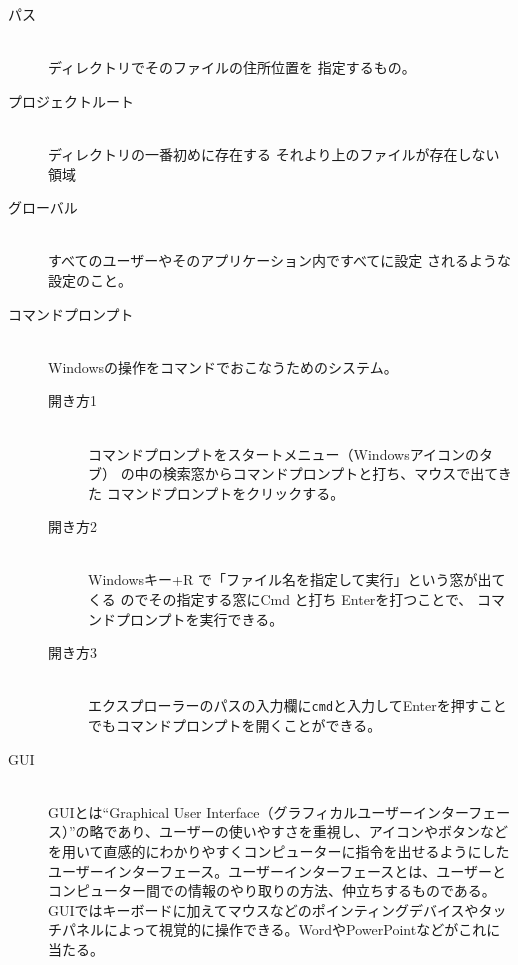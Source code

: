 \documentclass[titlepage]{ltjsarticle}
\begin{document}
\begin{description}
  \item [パス] ~\\
        ディレクトリでそのファイルの住所位置を
        指定するもの。
  \item [プロジェクトルート] ~\\
        ディレクトリの一番初めに存在する
        それより上のファイルが存在しない領域
  \item [グローバル] ~\\
        すべてのユーザーやそのアプリケーション内ですべてに設定
        されるような設定のこと。
  \item [コマンドプロンプト] ~\\
        Windowsの操作をコマンドでおこなうためのシステム。
        \begin{description}
          \item[開き方1] ~\\
            コマンドプロンプトをスタートメニュー（Windowsアイコンのタブ）
            の中の検索窓からコマンドプロンプトと打ち、マウスで出てきた
            コマンドプロンプトをクリックする。
          \item[開き方2] ~\\
            Windowsキー+R で「ファイル名を指定して実行」という窓が出てくる
            のでその指定する窓にCmd と打ち Enterを打つことで、
            コマンドプロンプトを実行できる。
            \item[開き方3]~\\
            エクスプローラーのパスの入力欄に\verb|cmd|と入力してEnterを押すことでもコマンドプロンプトを開くことができる。
        \end{description}
        \item[GUI]~\\
        GUIとは``Graphical User Interface（グラフィカルユーザーインターフェース）''の略であり、ユーザーの使いやすさを重視し、アイコンやボタンなどを用いて直感的にわかりやすくコンピューターに指令を出せるようにしたユーザーインターフェース。ユーザーインターフェースとは、ユーザーとコンピューター間での情報のやり取りの方法、仲立ちするものである。GUIではキーボードに加えてマウスなどのポインティングデバイスやタッチパネルによって視覚的に操作できる。WordやPowerPointなどがこれに当たる。

\end{description}
\end{document}

